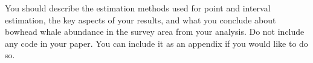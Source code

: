 You should describe the estimation methods used for point and interval estimation, the key aspects of your results, and what you conclude about bowhead whale abundance in the survey area from your analysis. Do not include any code in your paper. You can include it as an appendix if you would like to do so. %
